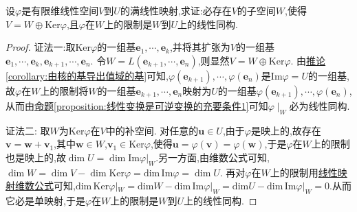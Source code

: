 \documentclass[../../main.tex]{subfiles}%
\begin{document}
\begin{example}
设\(\varphi\)是有限维线性空间\(V\)到\(U\)的满线性映射,求证:必存在\(V\)的子空间\(W\),使得\(V = W\oplus\text{Ker}\varphi\),且\(\varphi\)在\(W\)上的限制是\(W\)到\(U\)上的线性同构.
\end{example}
\begin{proof}

{\color{blue}证法一:}取\(\text{Ker}\varphi\)的一组基\(\boldsymbol{e}_1,\cdots,\boldsymbol{e}_k\),并将其扩张为\(V\)的一组基\(\boldsymbol{e}_1,\cdots,\boldsymbol{e}_k,\boldsymbol{e}_{k + 1},\cdots,\boldsymbol{e}_n\). 令\(W = L(\boldsymbol{e}_{k + 1},\cdots,\boldsymbol{e}_n)\),则显然\(V = W\oplus\text{Ker}\varphi\). 由\hyperref[corollary:由核的基导出值域的基]{推论\ref{corollary:由核的基导出值域的基}}可知,\(\varphi(\boldsymbol{e}_{k + 1}),\cdots,\varphi(\boldsymbol{e}_n)\)是\(\text{Im}\varphi = U\)的一组基,故\(\varphi\)在\(W\)上的限制将\(W\)的一组基\(\boldsymbol{e}_{k + 1},\cdots,\boldsymbol{e}_n\)映射为\(U\)的一组基\(\varphi(\boldsymbol{e}_{k + 1}),\cdots,\varphi(\boldsymbol{e}_n)\),从而由\hyperref[proposition:线性变换是可逆变换的充要条件1]{命题\ref{proposition:线性变换是可逆变换的充要条件1}}可知$\varphi \mid_{W}$必为线性同构.

{\color{blue}证法二:} 取\(W\)为\(\text{Ker}\varphi\)在\(V\)中的补空间. 对任意的\(\boldsymbol{u}\in U\),由于\(\varphi\)是映上的,故存在\(\boldsymbol{v}=\boldsymbol{w}+\boldsymbol{v}_1\),其中\(\boldsymbol{w}\in W\),\(\boldsymbol{v}_1\in\text{Ker}\varphi\),使得\(\boldsymbol{u}=\varphi(\boldsymbol{v})=\varphi(\boldsymbol{w})\),于是\(\varphi\)在\(W\)上的限制也是映上的,故$\dim U=\dim \text{Im}\varphi|_W$.另一方面,由维数公式可知,\(\dim W=\dim V-\dim\text{Ker}\varphi=\mathrm{dim}\,\mathrm{Im}\varphi =\dim U\). 再对\(\varphi\)在\(W\)上的限制用\hyperref[theorem:值域和核空间维数之和等于原像空间维数]{线性映射维数公式}可知,$\mathrm{dim}\,\mathrm{Ker}\varphi |_W=\mathrm{dim}W-\mathrm{dim}\,\mathrm{Im}\varphi |_W=\mathrm{dim}U-\mathrm{dim}\,\mathrm{Im}\varphi |_W=0$.从而它必是单映射,于是\(\varphi\)在\(W\)上的限制是\(W\)到\(U\)上的线性同构. 

\end{proof}
\end{document}
